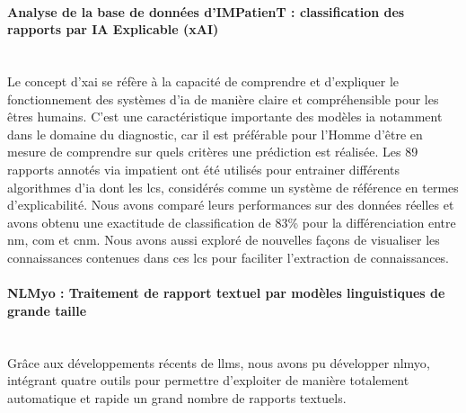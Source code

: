 \paragraph{\textbf{Analyse de la base de données d’IMPatienT : classification des rapports par IA Explicable (xAI)}}\mbox{}\\

Le concept d’\gls{xai} se réfère à la capacité de comprendre et d’expliquer le fonctionnement des systèmes d’\gls{ia} de manière claire et compréhensible pour les êtres humains. C’est une caractéristique importante des modèles \gls{ia} notamment dans le domaine du diagnostic, car il est préférable pour l’Homme d’être en mesure de comprendre sur quels critères une prédiction est réalisée. Les 89 rapports annotés via \gls{impatient} ont été utilisés pour entrainer différents algorithmes d'\gls{ia} dont les \gls{lcs}, considérés comme un système de référence en termes d’explicabilité. Nous avons comparé leurs performances sur des données réelles et avons obtenu une exactitude de classification de 83\% pour la différenciation entre \gls{nm}, \gls{com} et \gls{cnm}. Nous avons aussi exploré de nouvelles façons de visualiser les connaissances contenues dans ces \gls{lcs} pour faciliter l’extraction de connaissances.

\paragraph{\textbf{NLMyo : Traitement de rapport textuel par modèles linguistiques de grande taille}}\mbox{}\\

Grâce aux développements récents de \gls{llms}, nous avons pu développer \gls{nlmyo}, intégrant quatre outils pour permettre d’exploiter de manière totalement automatique et rapide un grand nombre de rapports textuels.

